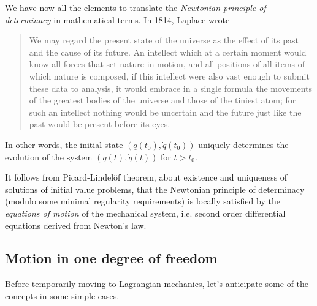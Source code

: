 \documentclass[english,fontsize=11pt,paper=a5,oneside]{scrbook}
\theoremstyle{definition}
\begin{document}
We have now all the elements to translate the \emph{Newtonian principle of determinacy} in mathematical terms. 
In 1814, Laplace \cite{book:laplace} wrote

\begin{quotation}
    We may regard the present state of the universe as the effect of its past and the cause of its future. An intellect which at a certain moment would know all forces that set nature in motion, and all positions of all items of which nature is composed, if this intellect were also vast enough to submit these data to analysis, it would embrace in a single formula the movements of the greatest bodies of the universe and those of the tiniest atom; for such an intellect nothing would be uncertain and the future just like the past would be present before its eyes.
\end{quotation}

\begin{tcolorbox}
In other words, the initial state $\left(q(t_0), \dot q(t_0)\right)$ uniquely determines the evolution of the system $\left(q(t),\dot q(t)\right)$ for $t > t_0$.
\end{tcolorbox}

It follows from Picard-Lindel\"of theorem, about existence and uniqueness of solutions of initial value problems, that the Newtonian principle of determinacy (modulo some minimal regularity requirements) is locally satisfied by the \emph{equations of motion} of the mechanical system, i.e. second order differential equations derived from Newton's law.

\subsection{Motion in one degree of freedom}
Before temporarily moving to Lagrangian mechanics, let's anticipate some of the concepts in some simple cases.
\end{document}
